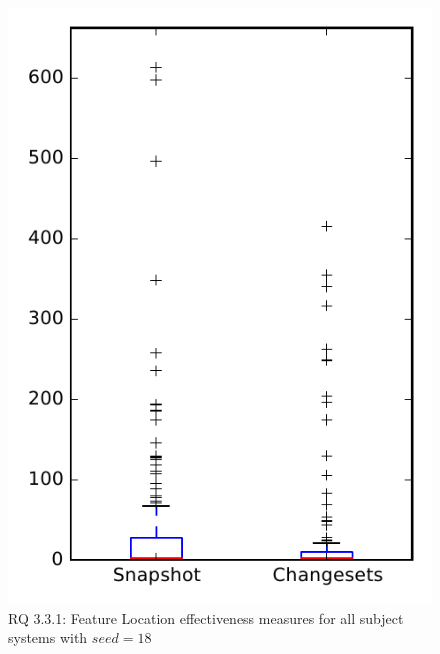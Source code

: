 
\begin{figure}
\centering
\includegraphics[height=0.4\textheight]{figures/flt_seed/rq1_overview_18}
\caption{RQ 3.3.1: Feature Location effectiveness measures for all subject systems with $seed=18$}
\label{fig:flt_seed:rq1:overview}
\end{figure}
